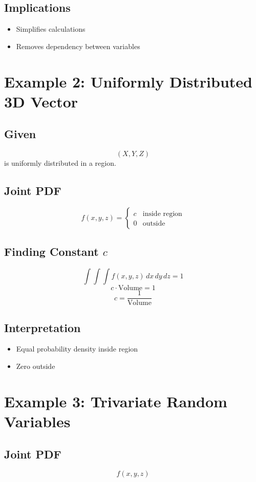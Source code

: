 \documentclass[12pt]{article}
\begin{document}
\subsection*{Implications}
\begin{itemize}
    \item Simplifies calculations
    \item Removes dependency between variables
\end{itemize}

\section*{Example 2: Uniformly Distributed 3D Vector}

\subsection*{Given}
\[
(X, Y, Z)
\]
is uniformly distributed in a region.

\subsection*{Joint PDF}
\[
f(x,y,z) =
\begin{cases}
c & \text{inside region} \\
0 & \text{outside}
\end{cases}
\]

\subsection*{Finding Constant $c$}
\[
\int \int \int f(x,y,z)\, dx\, dy\, dz = 1
\]
\[
c \cdot \text{Volume} = 1
\]
\[
c = \frac{1}{\text{Volume}}
\]

\subsection*{Interpretation}
\begin{itemize}
    \item Equal probability density inside region
    \item Zero outside
\end{itemize}

\section*{Example 3: Trivariate Random Variables}

\subsection*{Joint PDF}
\[
f(x,y,z)
\]
\end{document}
